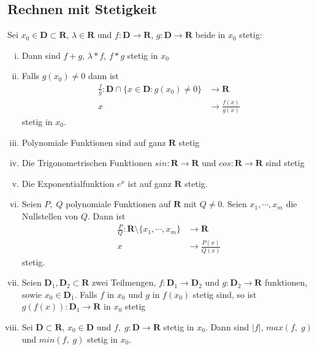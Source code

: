 \documentclass[8pt]{article}
\begin{document}
\begin{multicols*}{3}

\subsection{Rechnen mit Stetigkeit}

Sei $x_0 \in \mathbf{D} \subset \mathbf{R}$, $\lambda \in \mathbf{R}$ und $f: \mathbf{D} \rightarrow \mathbf{R}$,
$g: \mathbf{D} \rightarrow \mathbf{R}$ beide in $x_0$ stetig:
\begin{enumerate}[(i)]
  \item Dann sind $f + g$, $\lambda * f$, $f * g$ stetig in $x_0$
  \item Falls $g(x_0) \neq 0$ dann ist
  \begin{align*}
    \frac{f}{g}: \mathbf{D} \cap \{x \in \mathbf{D}: g(x_0) \neq 0\} &\rightarrow \mathbf{R}\\
    x &\rightarrow \frac{f(x)}{g(x)}
  \end{align*}
  stetig in $x_0$.
  \item Polynomiale Funktionen sind auf ganz $\mathbf{R}$ stetig
  \item Die Trigonometrischen Funktionen $sin: \mathbf{R} \rightarrow \mathbf{R}$ und $cos: \mathbf{R} \rightarrow \mathbf{R}$ sind stetig
  \item Die Exponentialfunktion $e^x$ ist auf ganz $\mathbf{R}$ stetig.
  \item Seien $P, \;Q$ polynomiale Funktionen auf $\mathbf{R}$ mit $Q \neq 0$.
  Seien $x_1, \cdots, x_m$ die Nullstellen von $Q$. Dann ist
  \begin{align*}
    \frac{P}{Q} : \mathbf{R} \setminus \{x_1, \cdots, x_m\} &\rightarrow \mathbf{R}\\
    x &\rightarrow \frac{P(x)}{Q(x)}
  \end{align*}
  stetig.
  \item Seien $\mathbf{D}_1, \mathbf{D}_2 \subset \mathbf{R}$ zwei Teilmengen,
  $f:\mathbf{D}_1 \rightarrow \mathbf{D}_2$ und $g:\mathbf{D}_2 \rightarrow \mathbf{R}$
  funktionen, sowie $x_0 \in \mathbf{D}_1$. Falls $f$ in $x_0$ und $g$ in $f(x_0)$ stetig
  sind, so ist $g(f(x)): \mathbf{D}_1 \rightarrow \mathbf{R}$ in $x_0$ stetig
  \item Sei $\mathbf{D} \subset \mathbf{R}$, $x_0 \in \mathbf{D}$ und $f,\;g: \mathbf{D} \rightarrow \mathbf{R}$
  stetig in $x_0$. Dann sind $|f|$, $max(f,\;g)$ und $min(f, \; g)$ stetig in $x_0$.
\end{enumerate}


\end{multicols*}
\end{document}
